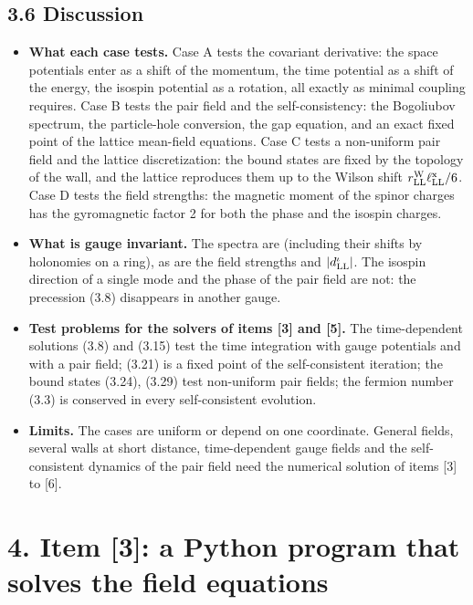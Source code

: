 \documentclass[
  10pt,
]{article}
\providecommand{\tightlist}{%
  \setlength{\itemsep}{0pt}\setlength{\parskip}{0pt}}
\begin{document}
\hypertarget{discussion-1}{%
\subsection{3.6 Discussion}\label{discussion-1}}

\begin{itemize}
\tightlist
\item
  \textbf{What each case tests.} Case A tests the covariant derivative:
  the space potentials enter as a shift of the momentum, the time
  potential as a shift of the energy, the isospin potential as a
  rotation, all exactly as minimal coupling requires. Case B tests the
  pair field and the self-consistency: the Bogoliubov spectrum, the
  particle-hole conversion, the gap equation, and an exact fixed point
  of the lattice mean-field equations. Case C tests a non-uniform pair
  field and the lattice discretization: the bound states are fixed by
  the topology of the wall, and the lattice reproduces them up to the
  Wilson shift \(r^{\rm W}_{\rm LL}\ell^{\rm x}_{\rm LL}/6\). Case D
  tests the field strengths: the magnetic moment of the spinor charges
  has the gyromagnetic factor 2 for both the phase and the isospin
  charges.
\item
  \textbf{What is gauge invariant.} The spectra are (including their
  shifts by holonomies on a ring), as are the field strengths and
  \(\lvert d^\iota_{\rm LL}\rvert\). The isospin direction of a single
  mode and the phase of the pair field are not: the precession (3.8)
  disappears in another gauge.
\item
  \textbf{Test problems for the solvers of items {[}3{]} and {[}5{]}.}
  The time-dependent solutions (3.8) and (3.15) test the time
  integration with gauge potentials and with a pair field; (3.21) is a
  fixed point of the self-consistent iteration; the bound states (3.24),
  (3.29) test non-uniform pair fields; the fermion number (3.3) is
  conserved in every self-consistent evolution.
\item
  \textbf{Limits.} The cases are uniform or depend on one coordinate.
  General fields, several walls at short distance, time-dependent gauge
  fields and the self-consistent dynamics of the pair field need the
  numerical solution of items {[}3{]} to {[}6{]}.
\end{itemize}

\hypertarget{item-3-a-python-program-that-solves-the-field-equations}{%
\section{4. Item {[}3{]}: a Python program that solves the field
equations}\label{item-3-a-python-program-that-solves-the-field-equations}}
\end{document}
